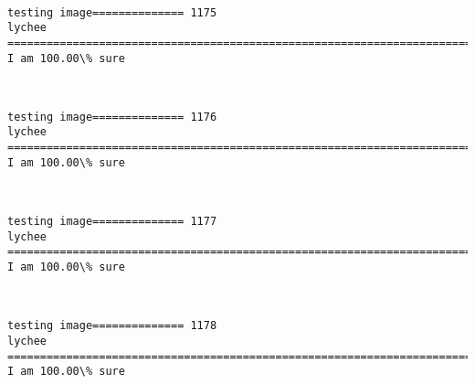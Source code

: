 \documentclass[11pt]{article}
\begin{document}
    \begin{center}
    \end{center}
    { \hspace*{\fill} \\}
    
    \begin{Verbatim}[commandchars=\\\{\}]
testing image============== 1175
lychee
============================================================================
I am 100.00\% sure

    \end{Verbatim}

    \begin{center}
    \end{center}
    { \hspace*{\fill} \\}
    
    \begin{Verbatim}[commandchars=\\\{\}]
testing image============== 1176
lychee
============================================================================
I am 100.00\% sure

    \end{Verbatim}

    \begin{center}
    \end{center}
    { \hspace*{\fill} \\}
    
    \begin{Verbatim}[commandchars=\\\{\}]
testing image============== 1177
lychee
============================================================================
I am 100.00\% sure

    \end{Verbatim}

    \begin{center}
    \end{center}
    { \hspace*{\fill} \\}
    
    \begin{Verbatim}[commandchars=\\\{\}]
testing image============== 1178
lychee
============================================================================
I am 100.00\% sure

    \end{Verbatim}
\end{document}
